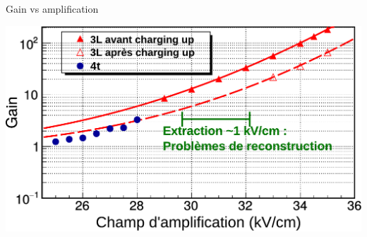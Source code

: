     \begin{frame}{Gain vs amplification}
        \begin{scriptsize}
            \centering \includegraphics[width=\textwidth]{./pictures/gain_vs_ampli_circle.pdf} \\ 
        \end{scriptsize}
    \end{frame}
    

